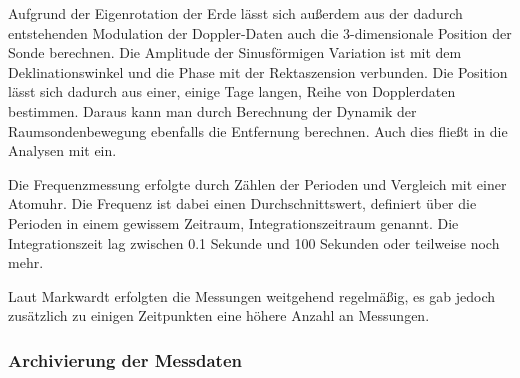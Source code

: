 Aufgrund der Eigenrotation der Erde lässt sich außerdem aus der dadurch entstehenden Modulation der Doppler-Daten auch die 3-dimensionale Position der Sonde berechnen. Die Amplitude der Sinusförmigen Variation ist mit dem Deklinationswinkel und die Phase mit der Rektaszension verbunden. Die Position lässt sich dadurch aus einer, einige Tage langen, Reihe von Dopplerdaten bestimmen. Daraus kann man durch Berechnung der Dynamik der Raumsondenbewegung ebenfalls die Entfernung berechnen. Auch dies fließt in die Analysen mit ein.\cite{Anderson2002} %


Die Frequenzmessung erfolgte durch Zählen der Perioden und Vergleich mit einer Atomuhr\cite{Nieto2007}. %
Die Frequenz ist dabei einen Durchschnittswert, definiert über die Perioden in einem gewissem Zeitraum, Integrationszeitraum genannt. Die Integrationszeit lag zwischen 0.1 Sekunde und 100 Sekunden oder teilweise noch mehr\cite{Markwardt2002}.

Laut Markwardt\cite{Markwardt2002} erfolgten die Messungen weitgehend regelmäßig, es gab jedoch zusätzlich zu einigen Zeitpunkten eine höhere Anzahl an Messungen.



\subsubsection{Archivierung der Messdaten}

